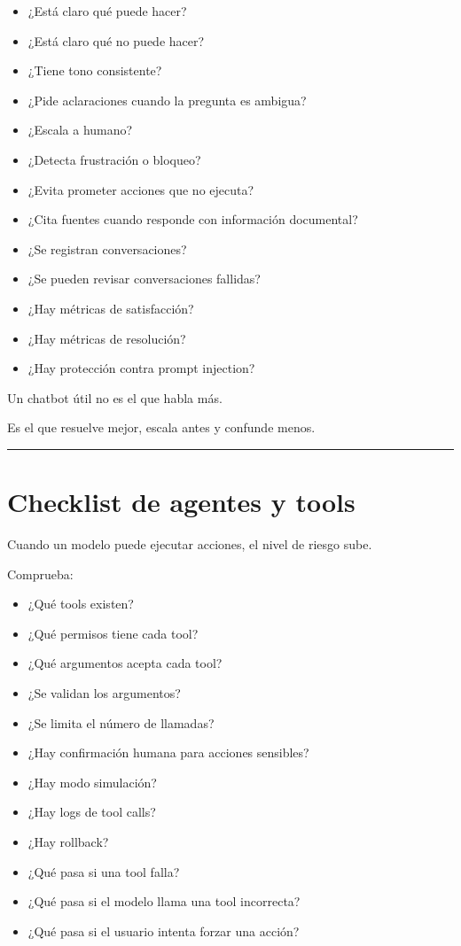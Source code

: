 \begin{itemize}
\tightlist
\item
  ¿Está claro qué puede hacer?
\item
  ¿Está claro qué no puede hacer?
\item
  ¿Tiene tono consistente?
\item
  ¿Pide aclaraciones cuando la pregunta es ambigua?
\item
  ¿Escala a humano?
\item
  ¿Detecta frustración o bloqueo?
\item
  ¿Evita prometer acciones que no ejecuta?
\item
  ¿Cita fuentes cuando responde con información documental?
\item
  ¿Se registran conversaciones?
\item
  ¿Se pueden revisar conversaciones fallidas?
\item
  ¿Hay métricas de satisfacción?
\item
  ¿Hay métricas de resolución?
\item
  ¿Hay protección contra prompt injection?
\end{itemize}

Un chatbot útil no es el que habla más.

Es el que resuelve mejor, escala antes y confunde menos.

\begin{center}\rule{0.5\linewidth}{0.5pt}\end{center}

\section{Checklist de agentes y
tools}\label{checklist-de-agentes-y-tools}

Cuando un modelo puede ejecutar acciones, el nivel de riesgo sube.

Comprueba:

\begin{itemize}
\tightlist
\item
  ¿Qué tools existen?
\item
  ¿Qué permisos tiene cada tool?
\item
  ¿Qué argumentos acepta cada tool?
\item
  ¿Se validan los argumentos?
\item
  ¿Se limita el número de llamadas?
\item
  ¿Hay confirmación humana para acciones sensibles?
\item
  ¿Hay modo simulación?
\item
  ¿Hay logs de tool calls?
\item
  ¿Hay rollback?
\item
  ¿Qué pasa si una tool falla?
\item
  ¿Qué pasa si el modelo llama una tool incorrecta?
\item
  ¿Qué pasa si el usuario intenta forzar una acción?
\end{itemize}


